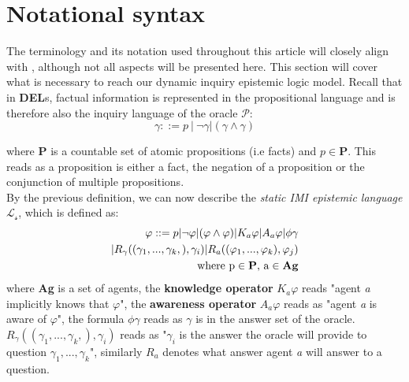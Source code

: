 \section{Notational syntax}
The terminology and its notation used throughout this article will closely
align with \cite{delimi}, although not all aspects will be presented here. This
section will cover what is necessary to reach our dynamic inquiry epistemic
logic model. Recall that in \textbf{DEL}s, factual information is represented
in the propositional language and is therefore also the inquiry language of the
oracle $\mathscr{P}$: $$ \gamma::= p\:|\:\neg\gamma|(\gamma\land\gamma) $$

where \textbf{P} is a countable set of atomic propositions (i.e facts) and $p \in
	\mathbf{P}$. This reads as a proposition is either a fact, the negation of a
proposition or the conjunction of multiple propositions.\\ By the previous
definition, we can now describe the \textit{static IMI epistemic language}
$\mathscr{L_s}$, which is defined as:
\begin{align*}
	\varphi ::= p |\neg\varphi|(\varphi \land \varphi) | K_a\varphi | A_a\varphi | \phi\gamma \\| R_\gamma((\gamma_1,...,\gamma_k,), \gamma_i) | R_a((\varphi_1,...,\varphi_k), \varphi_j) \\ \text{where p} \in \text{\textbf{P}}\text{, a} \in \text{\textbf{Ag}}
\end{align*}
where \textbf{Ag} is a set of agents, the \textbf{knowledge operator} $K_a\varphi$ reads "agent \textit{a} implicitly knows that $\varphi$", the \textbf{awareness operator} $A_a\varphi$ reads as "agent \textit{a} is aware of $\varphi$", the formula $\phi\gamma$ reads as $\gamma$ is in the answer set of the oracle. $R_\gamma((\gamma_1,...,\gamma_k,), \gamma_i)$ reads as "$\gamma_i$ is the answer the oracle will provide to question $\gamma_1,...,\gamma_k$", similarly $R_a$ denotes what answer agent \textit{a} will answer to a question.


